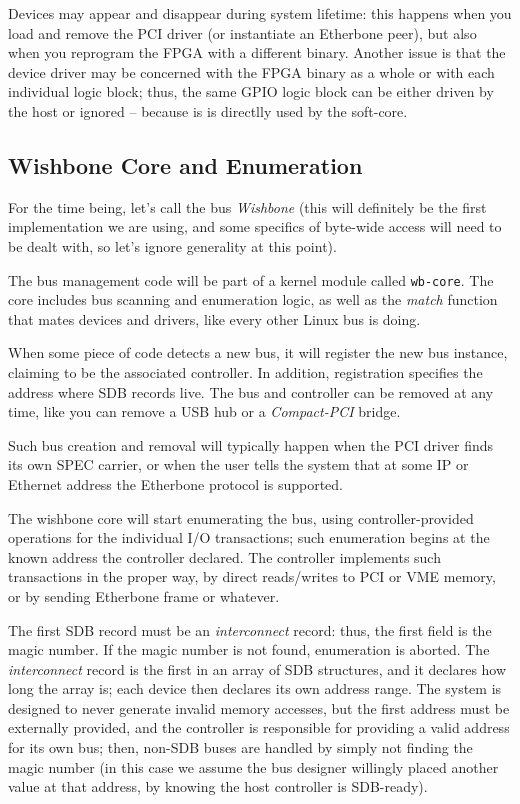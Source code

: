 \documentclass[a4paper, 12pt]{article}
\begin{document}
Devices may appear and disappear during system lifetime: this happens
when you load and remove the PCI driver (or instantiate an Etherbone
peer), but also when you reprogram the FPGA with a different binary.
Another issue is that the device driver may be concerned with the FPGA
binary as a whole or with each individual logic block; thus, the same
GPIO logic block can be either driven by the host or ignored -- because
is is directlly used by the soft-core.

\subsection{Wishbone Core and Enumeration}

For the time being, let's call the bus \textit{Wishbone} (this will
definitely be the first implementation we are using, and some specifics
of byte-wide access will need to be dealt with, so let's ignore
generality at this point).

The bus management code will be part of a kernel module called
\texttt{wb-core}. The core includes bus scanning and enumeration
logic, as well as the \textit{match} function that mates devices and
drivers, like every other Linux bus is doing.

When some piece of code detects a new bus, it will register the new
bus instance, claiming to be the associated controller.  In addition,
registration specifies the address where SDB records live. The bus and
controller can be removed at any time, like you can remove a USB hub
or a \textit{Compact-PCI} bridge.

Such bus creation and removal will typically happen when the PCI
driver finds its own SPEC carrier, or when the user tells the system
that at some IP or Ethernet address the Etherbone protocol is
supported.

The wishbone core will start enumerating the bus, using
controller-provided operations for the individual I/O transactions;
such enumeration begins at the known address the controller declared.
The controller implements such transactions in the proper way, by
direct reads/writes to PCI or VME memory, or by sending Etherbone frame
or whatever.

The first SDB record must be an \textit{interconnect} record: thus,
the first field is the magic number. If the magic number is not found,
enumeration is aborted.  The \textit{interconnect} record is the first
in an array of SDB structures, and it declares how long the array is;
each device then declares its own address range.  The system is
designed to never generate invalid memory accesses, but the first
address must be externally provided, and the controller is responsible
for providing a valid address for its own bus; then, non-SDB buses are
handled by simply not finding the magic number (in this case we assume
the bus designer willingly placed another value at that address, by
knowing the host controller is SDB-ready).
\end{document}
